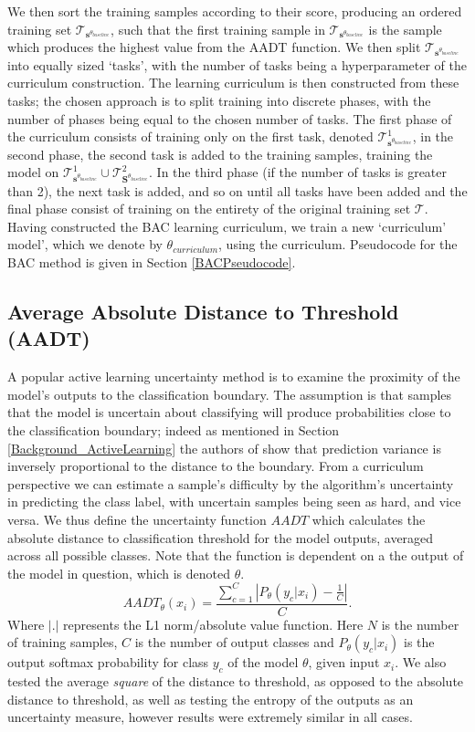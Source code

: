  We then sort the training samples according to their score, producing an ordered training set $\mathcal{T}_{\mathbf{s}^{\theta_{baseline}}}$, such that the first training sample in $\mathcal{T}_{\mathbf{s}^{\theta_{baseline}}}$ is the sample which produces the highest value from the AADT function. We then split $\mathcal{T}_{\mathbf{s}^{\theta_{baseline}}}$ into equally sized `tasks', with the number of tasks being a hyperparameter of the curriculum construction. The learning curriculum is then constructed from these tasks; the chosen approach is to split training into discrete phases, with the number of phases being equal to the chosen number of tasks. The first phase of the curriculum consists of training only on the first task, denoted $\mathcal{T}^1_{\mathbf{s}^{\theta_{baseline}}}$, in the second phase, the second task is added to the training samples, training the model on $\mathcal{T}^1_{\mathbf{s}^{\theta_{baseline}}}\cup\mathcal{T}^2_{\mathbf{S}^{\theta_{baseline}}}$. In the third phase (if the number of tasks is greater than 2), the next task is added, and so on until all tasks have been added and the final phase consist of training on the entirety of the original training set $\mathcal{T}$. Having constructed the BAC learning curriculum, we train a new `curriculum' model', which we denote by $\theta_{curriculum}$, using the curriculum. Pseudocode for the BAC method is given in Section \ref{BACPseudocode}.

\subsection{Average Absolute Distance to Threshold (AADT)}\label{BAC_AADT}
A popular active learning uncertainty method is to examine the proximity of the model's outputs to the classification boundary. The assumption is that samples that the model is uncertain about classifying will produce probabilities close to the classification boundary; indeed as mentioned in Section \ref{Background_ActiveLearning} the authors of \cite{Chang18} show that prediction variance is inversely proportional to the distance to the boundary. From a curriculum perspective we can estimate a sample's difficulty by the algorithm's uncertainty in predicting the class label, with uncertain samples being seen as hard, and vice versa. We thus define the uncertainty function $AADT$ which calculates the absolute distance to classification threshold for the model outputs, averaged across all possible classes. Note that the function is dependent on a the output of the model in question, which is denoted $\theta$.
\begin{equation}
AADT_{\theta}(x_i) = \frac{ \sum_{c=1}^{C} \left|P_{\theta}(y_c |x_i) - \frac{1}{C}\right|}{C}.
\end{equation}
Where $|.|$ represents the L1 norm/absolute value function.
Here $N$ is the number of training samples, $C$ is the number of output classes and $P_{\theta}(y_c |x_i)$ is the output softmax probability for class $y_c$ of the model $\theta$, given input $x_i$. We also tested the average \textit{square} of the distance to threshold, as opposed to the absolute distance to threshold, as well as testing the entropy of the outputs as an uncertainty measure, however results were extremely similar in all cases.

